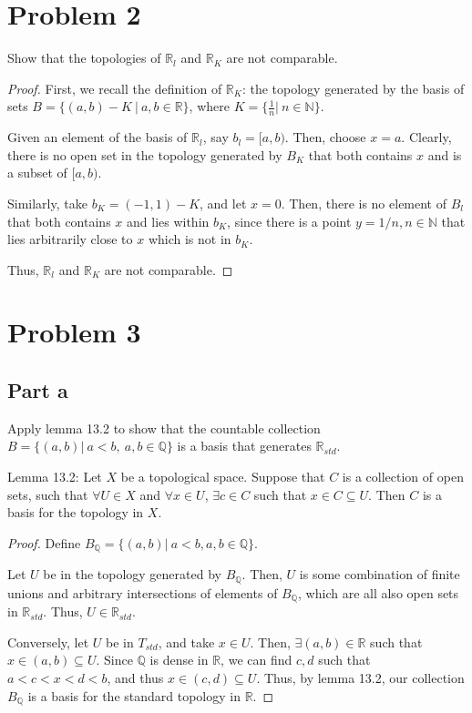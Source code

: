 \documentclass[11pt]{article}
\begin{document}
\section{Problem 2}
\label{sec:org509ef46}

Show that the topologies of \(\mathbb{R}_l\) and \(\mathbb{R}_K\) are not
comparable.

\begin{proof}
First, we recall the definition of \(\mathbb{R}_K\): the topology
generated by the basis of sets \(B = \{ (a,b) - K\ |\ a,b \in
\mathbb{R}\}\), where \(K = \{ \frac{1}{n} |\ n \in \mathbb{N}\}\).

Given an element of the basis of \(\mathbb{R}_l\), say \(b_l =
[a,b)\). Then, choose \(x = a\). Clearly, there is no open set in the
topology generated by \(B_K\) that both contains \(x\) and is a subset of
\([a,b)\).

Similarly, take \(b_K = (-1, 1) - K\), and let \(x = 0\). Then, there is
no element of \(B_l\) that both contains \(x\) and lies within \(b_K\),
since there is a point \(y = 1/n, n \in \mathbb{N}\) that lies
arbitrarily close to \(x\) which is not in \(b_K\). 

Thus, \(\mathbb{R}_l\) and \(\mathbb{R}_K\) are not comparable.
\end{proof}

\section{Problem 3}
\label{sec:org285ebe2}

\subsection{Part a}
\label{sec:org20dbca1}
Apply lemma 13.2 to show that the countable collection \(B = \{
(a,b) |\ a<b,\ a,b \in \mathbb{Q}\}\) is a basis that generates
\(\mathbb{R}_{std}\).

Lemma 13.2: Let \(X\) be a topological space. Suppose that \(C\) is a
collection of open sets, such that \(\forall U \in X\) and \(\forall x
\in U\), \(\exists c \in C\) such that \(x \in C \subseteq U\). Then \(C\) is
a basis for the topology in \(X\).

\begin{proof}


Define \(B_{\mathbb{Q}} = \{ (a,b) |\ a < b, a,b \in \mathbb{Q}\}\).

Let \(U\) be in the topology generated by \(B_{\mathbb{Q}}\). Then, \(U\) is
some combination of finite unions and arbitrary intersections of
elements of \(B_{\mathbb{Q}}\), which are all also open sets in
\(\mathbb{R}_{std}\). Thus, \(U \in \mathbb{R}_{std}\). 

Conversely, let \(U\) be in \(T_{std}\), and take \(x \in U\). Then,
\(\exists (a,b) \in \mathbb{R}\) such that \(x \in (a,b) \subseteq
U\). Since \(\mathbb{Q}\) is dense in \(\mathbb{R}\), we can find \(c,d\)
such that \(a < c < x < d < b\), and thus \(x \in (c,d) \subseteq
U\). Thus, by lemma 13.2, our collection \(B_{\mathbb{Q}}\) is a basis
for the standard topology in \(\mathbb{R}\).
\end{proof}
\end{document}
